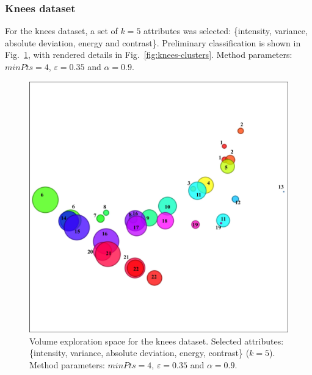 \subsubsection{Knees dataset}
\label{subsubsect:knees-dataset}

For the knees dataset, a set of \(k = 5\) attributes was selected: \{intensity, variance, absolute deviation, energy and contrast\}. Preliminary classification is shown in Fig.~\ref{fig:knees-tf-clusters}, with rendered details in Fig.~\ref{fig:knees-clusters}. Method parameters: $minPts=4$, $\varepsilon=0.35$ and $\alpha=0.9$.

\begin{figure}[htb!]
    \centering
    \includegraphics[width=0.7\columnwidth]{figs/knees-clusters-tf.jpg} 
    \caption{Volume exploration space for the knees dataset. Selected attributes: \{intensity, variance, absolute deviation, energy, contrast\} (\(k=5\)). Method parameters: $minPts=4$, $\varepsilon=0.35$ and $\alpha=0.9$.}
    \label{fig:knees-tf-clusters}
\end{figure}

